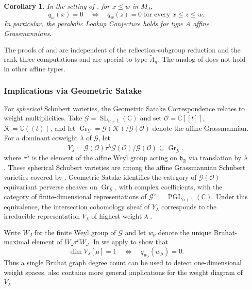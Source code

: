 \documentclass[11pt]{amsart}
\newtheorem{corollary}[corollary]{Corollary}
\theoremstyle{definition}
\theoremstyle{remark}
\numberwithin{equation}{section}
\newcommand{\C}{\mathbb C}
\begin{document}
\begin{corollary}\label{cor:grassmannian-lookup}
In the setting of , for
$x\le w$ in $M_J$,
\[
 q_w(x)=0
 \quad\Longleftrightarrow\quad
 q_w(z)=0\text{ for every }x\le z\le w.
\]
In particular, the parabolic Lookup Conjecture holds for type $A$ affine Grassmannians.
\end{corollary}

The proofs of  and 
are independent of the reflection-subgroup reduction and
the rank-three computations and are special to type $\widetilde{A}_n$. The analog of  does not hold in other affine types.

\subsubsection{Implications via Geometric Satake}
For \emph{spherical} Schubert varieties, the Geometric Satake Correspondence relates  to weight multiplicities.
Take $\mathcal{G}=\operatorname{SL}_{n+1}(\C)$ and set
$\mathcal O=\C[[t]]$, $\mathcal K=\C((t))$, and let 
$\operatorname{Gr}_{\mathcal{G}}=\mathcal{G}(\mathcal K)/\mathcal{G}(\mathcal O)$ denote the affine Grassmannian.
For a dominant coweight $\lambda$ of $\mathcal{G}$, let
\[
 Y_\lambda
 =\overline{\mathcal{G}(\mathcal O)\tau^\lambda \mathcal{G}(\mathcal O)/\mathcal{G}(\mathcal O)}
 \subseteq\operatorname{Gr}_{\mathcal{G}},
\]
where $\tau^\lambda$ is the element of the affine Weyl group acting on $\mathfrak{h}_{\mathbb{R}}$ via translation by $\lambda$.
These spherical Schubert varieties are among the affine
Grassmannian Schubert varieties covered by
. Geometric Satake identifies the
category of $\mathcal{G}(\mathcal O)$-equivariant perverse sheaves on
$\operatorname{Gr}_{\mathcal{G}}$, with complex coefficients, with the
category of finite-dimensional representations of
$\mathcal{G}^\vee=\operatorname{PGL}_{n+1}(\C)$.
Under this equivalence, the intersection cohomology sheaf of
$Y_\lambda$ corresponds to the irreducible representation
$V_\lambda$ of highest weight $\lambda$
\cite[Thm.~7.3]{MV}. 

Write $W_J$ for the finite Weyl group of $\mathcal{G}$ and let $w_\nu$ denote the unique Bruhat-maximal element of $W_J\tau^\nu W_J$. In  we apply  to show that
\[
 \dim V_\lambda[\mu]=1
 \quad\Longleftrightarrow\quad
 q_{w_\lambda}(w_\mu)=0.
\]
Thus a single Bruhat graph degree count can be used to detect one-dimensional weight spaces.  also contains more general implications for the weight
diagram of $V_\lambda$.
\end{document}
